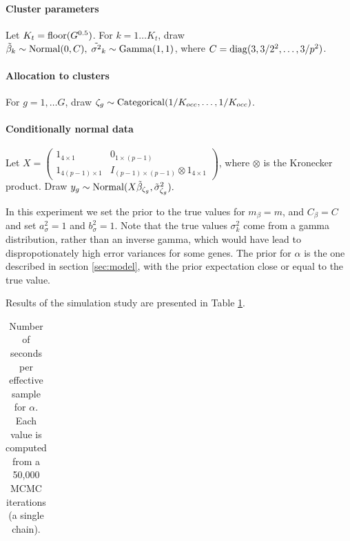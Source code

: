 {\paragraph{Cluster parameters}
Let $K_{t} = \operatorname{floor}(G^{0.5})$. For $k=1 \ldots K_{t}$, draw $\tilde{\beta}_k \sim \operatorname{Normal}(0, C),\; \tilde{\sigma^2}_k \sim \operatorname{Gamma}(1, 1)$, where $C=\operatorname{diag}(3, 3/2^2, \ldots, 3/p^2)$.
  
\paragraph{Allocation to clusters} For $g=1,\ldots G$, draw $\zeta_g \sim \operatorname{Categorical}(1/K_{occ},\ldots,1/K_{occ})$. 
  
\paragraph{Conditionally normal data}
 Let $X = \begin{pmatrix} 1_{4 \times 1} & 0_{1\times(p-1)}\\
                                 1_{4(p-1) \times 1} & I_{(p-1)\times(p-1)} \otimes 1_{4\times 1} \end{pmatrix}$, where $\otimes$ is the Kronecker product. Draw $y_{g} \sim \operatorname{Normal}(X\tilde{\beta}_{\zeta_g}, \tilde{\sigma}^2_{\zeta_g}).$


In this experiment we set the prior to the true values for $m_\beta = m$, and $C_\beta = C$ and set $a_\sigma^2=1$ and $b_\sigma^2=1$. Note that the true values $\sigma^2_k$ come from a gamma distribution, rather than an inverse gamma, which would have lead to dispropotionately high error variances for some genes. The prior for $\alpha$ is the one described in section \ref{sec:model}, with the prior expectation close or equal to the true value.

Results of the simulation study are presented in Table \ref{tab:neff-alpha}.

\begin{table}[ht]
\caption{Number of seconds per effective sample for $\alpha$. Each value is computed from a 50,000 MCMC iterations (a single chain).}
\label{tab:neff-alpha}
\centering
\begin{tabular}{rrrrrr}


\end{tabular}
\end{table}}
